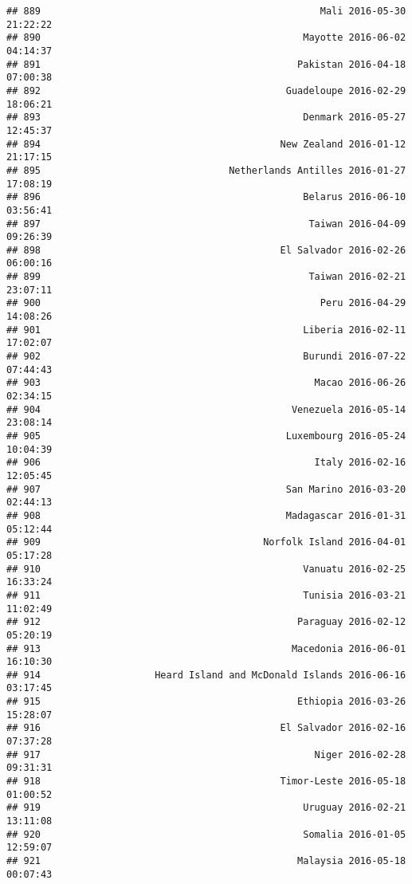 \documentclass[
]{article}
\begin{document}
\begin{verbatim}
## 889                                                 Mali 2016-05-30 21:22:22
## 890                                              Mayotte 2016-06-02 04:14:37
## 891                                             Pakistan 2016-04-18 07:00:38
## 892                                           Guadeloupe 2016-02-29 18:06:21
## 893                                              Denmark 2016-05-27 12:45:37
## 894                                          New Zealand 2016-01-12 21:17:15
## 895                                 Netherlands Antilles 2016-01-27 17:08:19
## 896                                              Belarus 2016-06-10 03:56:41
## 897                                               Taiwan 2016-04-09 09:26:39
## 898                                          El Salvador 2016-02-26 06:00:16
## 899                                               Taiwan 2016-02-21 23:07:11
## 900                                                 Peru 2016-04-29 14:08:26
## 901                                              Liberia 2016-02-11 17:02:07
## 902                                              Burundi 2016-07-22 07:44:43
## 903                                                Macao 2016-06-26 02:34:15
## 904                                            Venezuela 2016-05-14 23:08:14
## 905                                           Luxembourg 2016-05-24 10:04:39
## 906                                                Italy 2016-02-16 12:05:45
## 907                                           San Marino 2016-03-20 02:44:13
## 908                                           Madagascar 2016-01-31 05:12:44
## 909                                       Norfolk Island 2016-04-01 05:17:28
## 910                                              Vanuatu 2016-02-25 16:33:24
## 911                                              Tunisia 2016-03-21 11:02:49
## 912                                             Paraguay 2016-02-12 05:20:19
## 913                                            Macedonia 2016-06-01 16:10:30
## 914                    Heard Island and McDonald Islands 2016-06-16 03:17:45
## 915                                             Ethiopia 2016-03-26 15:28:07
## 916                                          El Salvador 2016-02-16 07:37:28
## 917                                                Niger 2016-02-28 09:31:31
## 918                                          Timor-Leste 2016-05-18 01:00:52
## 919                                              Uruguay 2016-02-21 13:11:08
## 920                                              Somalia 2016-01-05 12:59:07
## 921                                             Malaysia 2016-05-18 00:07:43

\end{verbatim}
\end{document}
